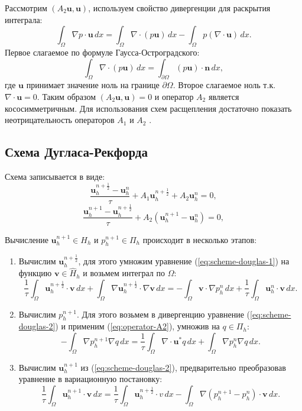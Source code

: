 \documentclass[12pt]{article}
\begin{document}
Рассмотрим  $(A_2 {\bm u}, {\bm u})$, используем свойство дивергенции для раскрытия интеграла:
$$
\int_{\Omega} \nabla p \cdot {\bm u} \, dx = \int_{\Omega} \nabla \cdot (p{\bm u}) \, dx - \int_{\Omega} p (\nabla \cdot {\bm u}) \, dx.
$$
Первое слагаемое по формуле Гаусса-Остроградского:
$$
\int_{\Omega} \nabla \cdot (p{\bm u}) \, dx = \int_{\partial \Omega} (p{\bm u}) \cdot {\bm n} \, dx,
$$ 
где ${\bm u}$ принимает значение ноль на границе $\partial \Omega$. Второе слагаемое ноль т.к. $\nabla \cdot {\bm u} = 0$. Таким образом $(A_2 {\bm u}, {\bm u}) = 0$ и оператор $A_2$ является кососимметричным.
Для использования схем расщепления достаточно показать неотрицательность операторов $A_1$ и $A_2$ \cite{vabishchevich-1999}.

\subsection{Схема Дугласа-Рекфорда}
Схема записывается в виде:
\begin{equation} \label{eq:scheme-douglas-1}
\frac{{\bm u}_h^{n + \frac{1}{2}} - {\bm u}_h^n}{\tau} + A_1 {\bm u}_h^{n + \frac{1}{2}}+A_2 {\bm u}_h^n=0,
\end{equation}
\begin{equation} \label{eq:scheme-douglas-2}
\frac{{\bm u}_h^{n+1}-{\bm u}_h^{n + \frac{1}{2}}}{\tau} + A_2 ({\bm u}_h^{n+1} - {\bm u}_h^{n} )=0,
\end{equation}

Вычисление ${\bm u}_h^{n+1} \in H_h$ и $p_h^{n+1} \in \Pi_h$ происходит в несколько этапов:
\begin{enumerate}
\item 
Вычислим ${\bm u}_h^{n + \frac{1}{2}}$, для этого умножим уравнение (\ref{eq:scheme-douglas-1}) на функцию ${\bm v} \in \hat H_h$ и возьмем интеграл по $\Omega$:
$$
\frac{1}{\tau}\int_{\Omega} {\bm u}_h^{n + \frac{1}{2}}\cdot {\bm v} \,dx + \int_{\Omega} \nabla {\bm u}_h^{n + \frac{1}{2}} \cdot \nabla {\bm v} \,dx = -\int_{\Omega} {\bm v} \cdot \nabla p_h^{n}\, dx + \frac{1}{\tau} \int_{\Omega} {\bm u}_h^{n} \cdot {\bm v} \,dx.
$$

\item Вычислим $p_h^{n+1}$. Для этого возьмем в дивергенцию уравнение ({\ref{eq:scheme-douglas-2}}) и применим ({\ref{eq:operator-A2}}), умножив на $q \in \Pi_h$:
$$
-\int_{\Omega} \nabla p_h^{n+1} \nabla q \,dx = \frac{1}{\tau} \int_{\Omega} \nabla \cdot {\bm u}^* q \,dx + \int_{\Omega} \nabla p_h^{n} \nabla q \,dx.
$$
\item 
Вычислим ${\bm u}_h^{n+1}$ из (\ref{eq:scheme-douglas-2}), предварительно преобразовав уравнение в вариационную постановку:
$$
\frac{1}{\tau} \int_{\Omega} {\bm u}_h^{n+1} \cdot {\bm v}\,dx = \frac{1}{\tau} \int_{\Omega} {\bm u}_h^{n+\frac{1}{2}} \cdot v \,dx - \int_{\Omega} \nabla (p_h^{n+1}-p_h^{n}) \cdot {\bm v} \,dx.
$$
\end{enumerate}
\end{document}
